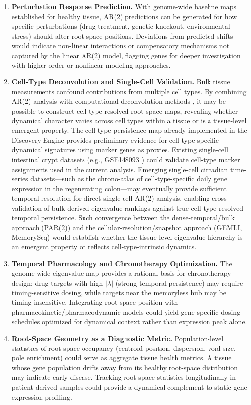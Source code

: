 \documentclass[11pt,letterpaper]{article}
\begin{document}
\begin{enumerate}[leftmargin=*, label=\textbf{\arabic*.}]
\item \textbf{Perturbation Response Prediction.}
With genome-wide baseline maps established for healthy tissue, AR(2) predictions can be generated for how specific perturbations (drug treatment, genetic knockout, environmental stress) should alter root-space positions. Deviations from predicted shifts would indicate non-linear interactions or compensatory mechanisms not captured by the linear AR(2) model, flagging genes for deeper investigation with higher-order or nonlinear modeling approaches.

\item \textbf{Cell-Type Deconvolution and Single-Cell Validation.}
Bulk tissue measurements confound contributions from multiple cell types. By combining AR(2) analysis with computational deconvolution methods \citep{newman2015, avila2018}, it may be possible to construct cell-type-resolved root-space maps, revealing whether dynamical character varies across cell types within a tissue or is a tissue-level emergent property. The cell-type persistence map already implemented in the Discovery Engine provides preliminary evidence for cell-type-specific dynamical signatures using marker genes as proxies. Existing single-cell intestinal crypt datasets (e.g., GSE148093 \citep{bues2022disco}) could validate cell-type marker assignments used in the current analysis. Emerging single-cell circadian time-series datasets---such as the chrono-atlas of cell-type-specific daily gene expression in the regenerating colon---may eventually provide sufficient temporal resolution for direct single-cell AR(2) analysis, enabling cross-validation of bulk-derived eigenvalue rankings against true cell-type-resolved temporal persistence. Such convergence between the dense-temporal/bulk approach (PAR(2)) and the cellular-resolution/snapshot approach (GEMLI, MemorySeq) would establish whether the tissue-level eigenvalue hierarchy is an emergent property or reflects cell-type-intrinsic dynamics.

\item \textbf{Temporal Pharmacology and Chronotherapy Optimization.}
The genome-wide eigenvalue map provides a rational basis for chronotherapy design: drug targets with high $|\lambda|$ (strong temporal persistence) may require timing-sensitive dosing, while targets near the memoryless hub may be timing-insensitive. Integrating root-space position with pharmacokinetic/pharmacodynamic models \citep{fujimoto2025} could yield gene-specific dosing schedules optimized for dynamical context rather than expression peak alone.

\item \textbf{Root-Space Geometry as a Diagnostic Metric.}
Population-level statistics of root-space occupancy (centroid position, dispersion, void size, pole enrichment) could serve as aggregate tissue health metrics. A tissue whose gene population drifts away from its healthy root-space distribution may indicate early disease. Tracking root-space statistics longitudinally in patient-derived samples could provide a dynamical complement to static gene expression profiling.

\end{enumerate}
\end{document}
